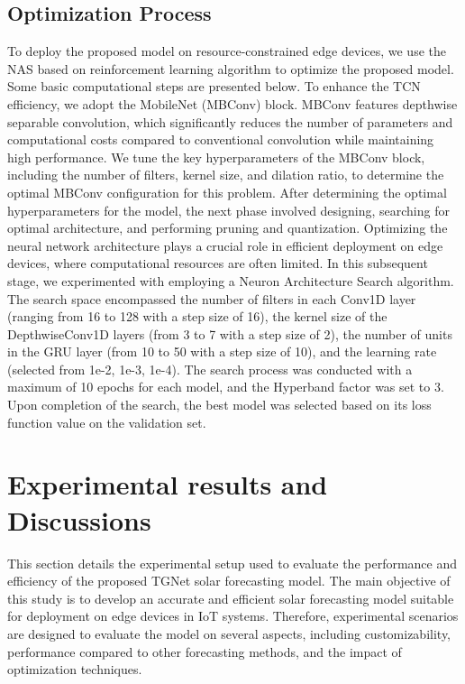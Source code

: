 \documentclass[sn-mathphys-num]{sn-jnl}%
\begin{document}
\subsection{Optimization Process}
 To deploy the proposed model on resource-constrained edge devices, we use the NAS based on reinforcement learning algorithm to optimize the proposed model. Some basic computational steps are presented below.
To enhance the TCN efficiency, we adopt the MobileNet (MBConv) block. MBConv features depthwise separable convolution, which significantly reduces the number of parameters and computational costs compared to conventional convolution while maintaining high performance. We tune the key hyperparameters of the MBConv block, including the number of filters, kernel size, and dilation ratio, to determine the optimal MBConv configuration for this problem. After determining the optimal hyperparameters for the model, the next phase involved designing, searching for optimal architecture, and performing pruning and quantization. Optimizing the neural network architecture plays a crucial role in efficient deployment on edge devices, where computational resources are often limited. In this subsequent stage, we experimented with employing a Neuron Architecture Search algorithm. The search space encompassed the number of filters in each Conv1D layer (ranging from 16 to 128 with a step size of 16), the kernel size of the DepthwiseConv1D layers (from 3 to 7 with a step size of 2), the number of units in the GRU layer (from 10 to 50 with a step size of 10), and the learning rate (selected from 1e-2, 1e-3, 1e-4). The search process was conducted with a maximum of 10 epochs for each model, and the Hyperband factor was set to 3. Upon completion of the search, the best model was selected based on its loss function value on the validation set. 

\section{Experimental results and Discussions}\label{sec4}

This section details the experimental setup used to evaluate the performance and efficiency of the proposed TGNet solar forecasting model. The main objective of this study is to develop an accurate and efficient solar forecasting model suitable for deployment on edge devices in IoT systems. Therefore, experimental scenarios are designed to evaluate the model on several aspects, including customizability, performance compared to other forecasting methods, and the impact of optimization techniques.
\end{document}
